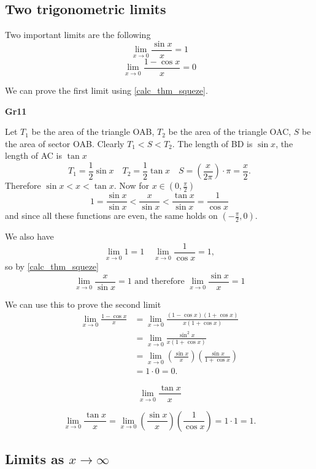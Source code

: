 \documentclass[10pt, a4paper]{article}
\begin{document}
\subsection{Two trigonometric limits}
Two important limits are the following
\[
\lim_{x \rightarrow 0}\frac{\sin x}{x} = 1
\]
\[
\lim_{x \rightarrow 0}\frac{1 - \cos x}{x} = 0
\]

We can prove the first limit using \autoref{calc_thm_squeze}.

\textbf{Gr11}

Let $T_1$ be the area of the triangle OAB, $T_2$ be the area of the triangle OAC, $S$ be the area of sector OAB. Clearly $T_1 < S < T_2$. The length of BD is $\sin x$, the length of AC is $\tan x$
\[
T_1 = \frac{1}{2}\sin x\quad T_2 = \frac{1}{2}\tan x\quad S = \left(\frac{x}{2\pi}\right) \cdot \pi = \frac{x}{2}.
\]
Therefore $\sin x < x < \tan x$. Now for $x \in \left(0, \frac{\pi}{2}\right)$
\[
1 = \frac{\sin x}{\sin x} < \frac{x}{\sin x} < \frac{\tan x}{\sin x} = \frac{1}{\cos x}
\]
and since all these functions are even, the same holds on $\left(-\frac{\pi}{2}, 0\right)$.

We also have
\[
\lim_{x \rightarrow 0} 1 = 1\quad\lim_{x \rightarrow 0}\frac{1}{\cos x} = 1,
\]
so by \autoref{calc_thm_squeze}
\[
\lim_{x \rightarrow 0}\frac{x}{\sin x} = 1\text{ and therefore } \lim_{x \rightarrow 0}\frac{\sin x}{x} = 1
\]

We can use this to prove the second limit
\begin{align*}
\lim_{x \rightarrow 0}\frac{1 - \cos x}{x} &= \lim_{x \rightarrow 0}\frac{(1 - \cos x)(1 + \cos x)}{x(1 + \cos x)} \\ 
&= \lim_{x \rightarrow 0}\frac{\sin ^ 2 x}{x(1 + \cos x)} \\
&= \lim_{x \rightarrow 0}\left(\frac{\sin x}{x}\right)\left(\frac{\sin x}{1 + \cos x}\right) \\
&= 1 \cdot 0 = 0.
\end{align*}

\begin{example}
    \[
    \lim_{x \rightarrow 0}\frac{\tan x}{x}
    \]

    \[
    \lim_{x \rightarrow 0}\frac{\tan x}{x} = \lim_{x \rightarrow 0} \left(\frac{\sin x}{x}\right) \left(\frac{1}{\cos x}\right) = 1 \cdot 1 = 1.
    \]
\end{example}

\subsection{Limits as $x \rightarrow \infty$}
\end{document}
